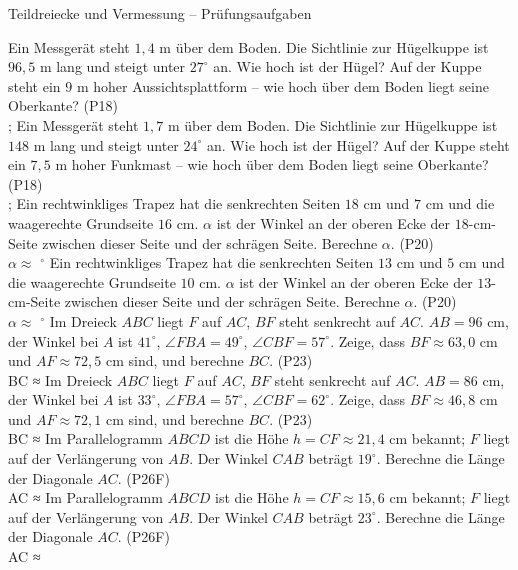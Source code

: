 \begin{aufgabe}{Teildreiecke und Vermessung – Prüfungsaufgaben}
\begin{teile}
\teil Ein Messgerät steht $1{,}4$ m über dem Boden. Die Sichtlinie zur Hügelkuppe ist $96{,}5$ m lang und steigt unter $27^\circ$ an. Wie hoch ist der Hügel? Auf der Kuppe steht ein $9$ m hoher Aussichtsplattform – wie hoch über dem Boden liegt seine Oberkante? \hfill (P18) \\ \leerfeld[m] ; \leerfeld[m]
\teil Ein Messgerät steht $1{,}7$ m über dem Boden. Die Sichtlinie zur Hügelkuppe ist $148$ m lang und steigt unter $24^\circ$ an. Wie hoch ist der Hügel? Auf der Kuppe steht ein $7{,}5$ m hoher Funkmast – wie hoch über dem Boden liegt seine Oberkante? \hfill (P18) \\ \leerfeld[m] ; \leerfeld[m]
\teil Ein rechtwinkliges Trapez hat die senkrechten Seiten $18$ cm und $7$ cm und die waagerechte Grundseite $16$ cm. $\alpha$ ist der Winkel an der oberen Ecke der $18$-cm-Seite zwischen dieser Seite und der schrägen Seite. Berechne $\alpha$. \hfill (P20) \\ $\alpha \approx$ \leerfeld $^\circ$
\teil Ein rechtwinkliges Trapez hat die senkrechten Seiten $13$ cm und $5$ cm und die waagerechte Grundseite $10$ cm. $\alpha$ ist der Winkel an der oberen Ecke der $13$-cm-Seite zwischen dieser Seite und der schrägen Seite. Berechne $\alpha$. \hfill (P20) \\ $\alpha \approx$ \leerfeld $^\circ$
\teil Im Dreieck $ABC$ liegt $F$ auf $AC$, $BF$ steht senkrecht auf $AC$. $AB = 96$ cm, der Winkel bei $A$ ist $41^\circ$, $\angle FBA = 49^\circ$, $\angle CBF = 57^\circ$. Zeige, dass $BF \approx 63{,}0$ cm und $AF \approx 72{,}5$ cm sind, und berechne $BC$. \hfill (P23) \\ BC ≈ \leerfeld[cm]
\teil Im Dreieck $ABC$ liegt $F$ auf $AC$, $BF$ steht senkrecht auf $AC$. $AB = 86$ cm, der Winkel bei $A$ ist $33^\circ$, $\angle FBA = 57^\circ$, $\angle CBF = 62^\circ$. Zeige, dass $BF \approx 46{,}8$ cm und $AF \approx 72{,}1$ cm sind, und berechne $BC$. \hfill (P23) \\ BC ≈ \leerfeld[cm]
\teil Im Parallelogramm $ABCD$ ist die Höhe $h = CF \approx 21{,}4$ cm bekannt; $F$ liegt auf der Verlängerung von $AB$. Der Winkel $CAB$ beträgt $19^\circ$. Berechne die Länge der Diagonale $AC$. \hfill (P26F) \\ AC ≈ \leerfeld[cm]
\teil Im Parallelogramm $ABCD$ ist die Höhe $h = CF \approx 15{,}6$ cm bekannt; $F$ liegt auf der Verlängerung von $AB$. Der Winkel $CAB$ beträgt $23^\circ$. Berechne die Länge der Diagonale $AC$. \hfill (P26F) \\ AC ≈ \leerfeld[cm]

\end{teile}
\end{aufgabe}
